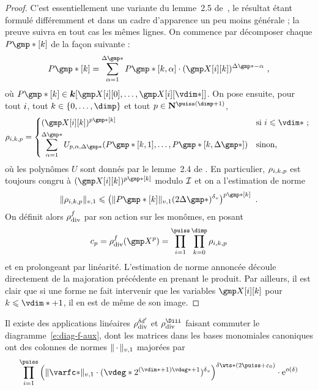 \begin{proof}
  C'est essentiellement une variante du lemme~2.5 de~\cite{remivg}, le résultat
  étant formulé différemment et dans un cadre d'apparence un peu moins
  générale ; la preuve suivra en tout cas les mêmes lignes. On commence par
  décomposer chaque \( P\mexp*[\ind] \) de la façon suivante :
  \begin{equation}
    P\mexp*[\ind]
    =
    \sum _{\alpha=1}^{\Delta\mexp*}
    P\mexp*[\ind, \alpha] \cdot (\cmh\fct[\ind])^{\Delta\mexp* - \alpha}
    \pmm,
  \end{equation}
  où \( P\mexp*[\ind] \in \cdn [ \cmh\fct[0], \dots, \cmh\fct[\vdim*] ] \).
  On pose ensuite, pour tout \( i \), tout
  \( \ind \in \{ 0, \dots, \dimp \} \) et tout
  \( p \in \N^{\puiss(\dimp+1)} \),
  \begin{equation}
    \rho_{\fct, \ind, p}
    =
    \begin{dcases*}
      ( \cmh\fct[\ind] ) ^{p\mexp*[\ind]}
      & si \( \fct \le \vdim* \) ;
      \\
      \sum _{\alpha=1}^{\Delta\mexp*}
      U_{p, \alpha, \Delta\mexp*}
      ( P\mexp*[\ind, 1], \dots, P\mexp*[\ind, \Delta\mexp*] )
      & sinon,
    \end{dcases*}
  \end{equation}
  où les polynômes \( U \) sont donnés par le lemme~2.4 de \cite{remivg}. En
  particulier, \( \rho_{i, k, p} \) est toujours congru à
  \( ( \cmh\fct[\ind] ) ^{p\mexp*[\ind]} \) modulo \( \mathcal I \) et on a
  l'estimation de norme
  \begin{equation}
    \nv1{ \rho_{\fct, \ind, p} }
    \le
    \left(
    \nv1{ P\mexp*[\ind] } (2\Delta\mexp*)^\dv
    \right) ^{p\mexp*[\ind]}
    \pmm.
  \end{equation}
  On définit alors \( \rho_{\mathrm{div }}^f \) par son action sur les monômes, en posant
  \begin{equation}
    c_p
    = \rdiv^f(\cmmh^p)
    = \prod\fctrange \prod\indrange \rho_{\fct, \ind, p}
  \end{equation}
  et en prolongeant par linéarité. L'estimation de norme annoncée découle
  directement de la majoration précédente en prenant le produit. Par ailleurs,
  il est clair que si une forme ne fait intervenir que les variables \(
  \cmh\fct[\ind] \) pour \( \ind \le \vdim* + 1 \), il en est de même de son
  image.
\end{proof}

\begin{coro} \label{c:hmat-rdiv}
  Il existe des applications linéaires \( \rho_{\mathrm{div }}^{\delta d'} \) et \( \rdiv^\Diii \)
  faisant commuter le diagramme~\ref{e:diag-f-aux}, dont les matrices dans
  les bases monomiales canoniques ont des colonnes de normes \( \lVert{\,\cdot\,}\rVert_{v, 1} \)
  majorées par
  \begin{equation}
    \prod\fctrange \left(
    \nv1{ \varfc* }
    \cdot ( \vdeg* 2^{(\vdim*+1)\vdeg* + 1} )^\dv
    \right) ^{ \delta \wts* (2\puiss + \epsz) }
    \cdot \expb^{ o(\delta) }
  \end{equation}
\end{coro}

